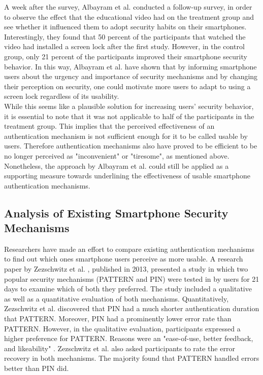 A week after the survey, Albayram et al. \cite{Albayram:2017:BUL:3235924.3235929} conducted a follow-up survey, in order to observe the effect that the educational video had on the treatment group and see whether it influenced them to adopt security habits on their smartphones. Interestingly, they found that 50 percent of the participants that watched the video had installed a screen lock after the first study. However, in the control group, only 21 percent of the participants improved their smartphone security behavior. In this way, Albayram et al. \cite{Albayram:2017:BUL:3235924.3235929} have shown that by informing smartphone users about the urgency and importance of security mechanisms and by changing their perception on security, one could motivate more users to adapt to using a screen lock regardless of its usability. \\

While this seems like a plausible solution for increasing users' security behavior, it is essential to note that it was not applicable to half of the participants in the treatment group. This implies that the perceived effectiveness of an authentication mechanism is not sufficient enough for it to be called usable by users. Therefore authentication mechanisms also have proved to be efficient to be no longer perceived as "inconvenient" or "tiresome", as mentioned above. Nonetheless, the approach by Albayram et al. \cite{Albayram:2017:BUL:3235924.3235929} could still be applied as a supporting measure towards underlining the effectiveness of usable smartphone authentication mechanisms. 

\subsection{Analysis of Existing Smartphone Security Mechanisms} \label{2.2.2}

Researchers have made an effort to compare existing authentication mechanisms to find out which ones smartphone users perceive as more usable. A research paper by Zezschwitz et al. \cite{PatternWild}, published in 2013, presented a study in which two popular security mechanisms (PATTERN and PIN) were tested in by users for 21 days to examine which of both they preferred. The study included a qualitative as well as a quantitative evaluation of both mechanisms. Quantitatively, Zezschwitz et al. \cite{PatternWild} discovered that PIN had a much shorter authentication duration that PATTERN. Moreover, PIN had a prominently lower error rate than PATTERN. However, in the qualitative evaluation, participants expressed a higher preference for PATTERN. Reasons were an "ease-of-use, better feedback, and likeability" \cite{PatternWild}. Zezschwitz et al. \cite{PatternWild} also asked participants to rate the error recovery in both mechanisms. The majority found that PATTERN handled errors better than PIN did.\\

